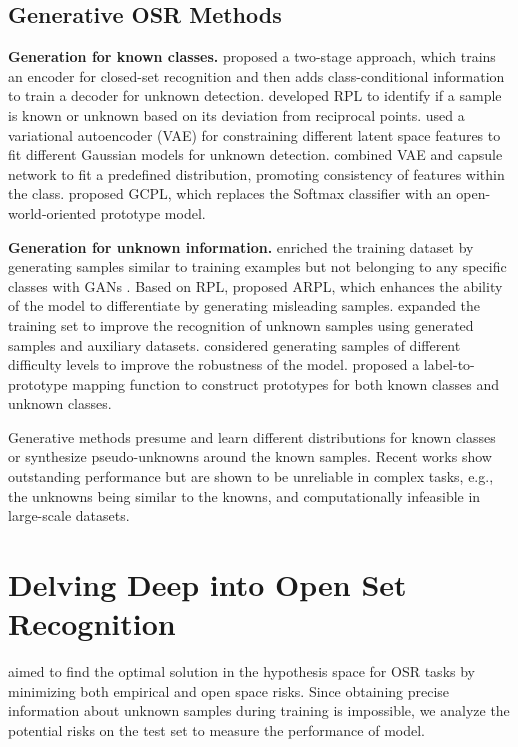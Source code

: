 \documentclass[letterpaper]{article} %
\begin{document}
\subsection{Generative OSR Methods}
\textbf{Generation for known classes.}
\cite{oza2019c2ae} proposed a two-stage approach, which trains an encoder for closed-set recognition and then adds class-conditional information to train a decoder for unknown detection. \cite{chen2020learning} developed RPL to identify if a sample is known or unknown based on its deviation from reciprocal points. \cite{sun2020open} used a variational autoencoder (VAE) for constraining different latent space features to fit different Gaussian models for unknown detection. \cite{guo2021conditional} combined VAE and capsule network to fit a predefined distribution, promoting consistency of features within the class. \cite{yang2022convolutional} proposed GCPL, which replaces the Softmax classifier with an open-world-oriented prototype model.


\noindent\textbf{Generation for unknown information.}
\cite{neal2018open} enriched the training dataset by generating samples similar to training examples but not belonging to any specific classes with GANs \cite{ian2014gan}. Based on RPL, \cite{chen2022adversarial} proposed ARPL, which enhances the ability of the model to differentiate by generating misleading samples. \cite{kong2022opengan} expanded the training set to improve the recognition of unknown samples using generated samples and auxiliary datasets. \cite{moon2022difficulty} considered generating samples of different difficulty levels to improve the robustness of the model. \cite{liu2023opentext} proposed a label-to-prototype mapping function to construct prototypes for both known classes and unknown classes.


Generative methods presume and learn different distributions for known classes or synthesize pseudo-unknowns around the known samples. Recent works show outstanding performance but are shown to be unreliable in complex tasks, e.g., the unknowns being similar to the knowns, and computationally infeasible in large-scale datasets.

\section{Delving Deep into Open Set Recognition}
\cite{scheirer2013open} aimed to find the optimal solution in the hypothesis space for OSR tasks by minimizing both empirical and open space risks. Since obtaining precise information about unknown samples during training is impossible, we analyze the potential risks on the test set to measure the performance of model.
\end{document}
